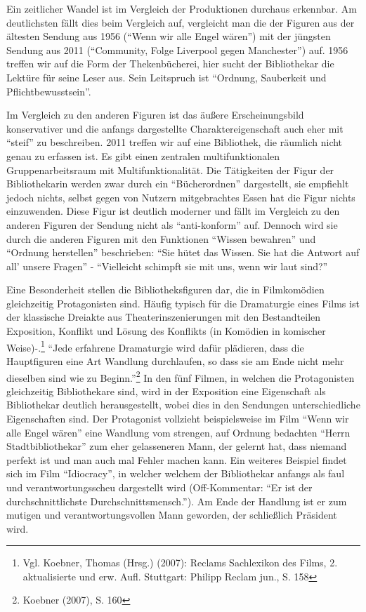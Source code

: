 
Ein zeitlicher Wandel ist im Vergleich der Produktionen durchaus
erkennbar. Am deutlichsten fällt dies beim Vergleich auf, vergleicht man
die der Figuren aus der ältesten Sendung aus 1956 (\enquote{Wenn wir
alle Engel wären}) mit der jüngsten Sendung aus 2011
(\enquote{Community, Folge Liverpool gegen Manchester}) auf. 1956
treffen wir auf die Form der Thekenbücherei, hier sucht der Bibliothekar
die Lektüre für seine Leser aus. Sein Leitspruch ist \enquote{Ordnung,
Sauberkeit und Pflichtbewusstsein}.

Im Vergleich zu den anderen Figuren ist das äußere Erscheinungsbild
konservativer und die anfangs dargestellte Charaktereigenschaft auch
eher mit \enquote{steif} zu beschreiben. 2011 treffen wir auf eine
Bibliothek, die räumlich nicht genau zu erfassen ist. Es gibt einen
zentralen multifunktionalen Gruppenarbeitsraum mit Multifunktionalität.
Die Tätigkeiten der Figur der Bibliothekarin werden zwar durch ein
\enquote{Bücherordnen} dargestellt, sie empfiehlt jedoch nichts, selbst
gegen von Nutzern mitgebrachtes Essen hat die Figur nichts einzuwenden.
Diese Figur ist deutlich moderner und fällt im Vergleich zu den anderen
Figuren der Sendung nicht als \enquote{anti-konform} auf. Dennoch wird
sie durch die anderen Figuren mit den Funktionen \enquote{Wissen
bewahren} und \enquote{Ordnung herstellen} beschrieben: \enquote{Sie
hütet das Wissen. Sie hat die Antwort auf all' unsere Fragen} -
\enquote{Vielleicht schimpft sie mit uns, wenn wir laut sind?}

Eine Besonderheit stellen die Bibliotheksfiguren dar, die in
Filmkomödien gleichzeitig Protagonisten sind. Häufig typisch für die
Dramaturgie eines Films ist der klassische Dreiakte aus
Theaterinszenierungen mit den Bestandteilen Exposition, Konflikt und
Lösung des Konflikts (in Komödien in komischer Weise)-.\footnote{Vgl.
  Koebner, Thomas (Hrsg.) (2007): Reclams Sachlexikon des Films, 2.
  aktualisierte und erw. Aufl. Stuttgart: Philipp Reclam jun., S. 158}
\enquote{Jede erfahrene Dramaturgie wird dafür plädieren, dass die
Hauptfiguren eine Art Wandlung durchlaufen, so dass sie am Ende nicht
mehr dieselben sind wie zu Beginn.}\footnote{Koebner (2007), S. 160} In
den fünf Filmen, in welchen die Protagonisten gleichzeitig Bibliothekare
sind, wird in der Exposition eine Eigenschaft als Bibliothekar deutlich
herausgestellt, wobei dies in den Sendungen unterschiedliche
Eigenschaften sind. Der Protagonist vollzieht beispielsweise im Film
\enquote{Wenn wir alle Engel wären} eine Wandlung vom strengen, auf
Ordnung bedachten \enquote{Herrn Stadtbibliothekar} zum eher
gelasseneren Mann, der gelernt hat, dass niemand perfekt ist und man
auch mal Fehler machen kann. Ein weiteres Beispiel findet sich im Film
\enquote{Idiocracy}, in welcher welchem der Bibliothekar anfangs als
faul und verantwortungsscheu dargestellt wird (Off-Kommentar:
\enquote{Er ist der durchschnittlichste Durchschnittsmensch.}). Am Ende
der Handlung ist er zum mutigen und verantwortungsvollen Mann geworden,
der schließlich Präsident wird.

